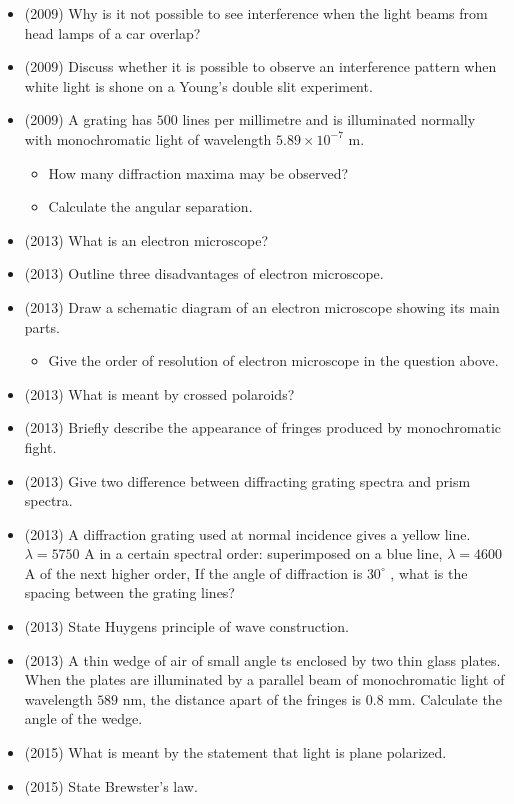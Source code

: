 \documentclass{article}
\begin{document}
\begin{itemize}
\item (2009)  Why is it not possible to see interference when the light beams from head lamps of a car overlap?
\item (2009)  Discuss whether it is possible to observe an interference pattern when white light is shone on a Young’s double slit experiment.
\item (2009)  A grating has $ 500$ lines per millimetre and is illuminated normally with monochromatic light of wavelength $ 5.89 \times 10^{-7}$ m.
 \begin{itemize}
\item How many diffraction maxima may be observed?
\item Calculate the angular separation.
\end{itemize}
\item (2013)  What is an electron microscope? 
\item (2013)  Outline three disadvantages of electron microscope.
\item (2013)  Draw a schematic diagram of an electron microscope showing its main parts.
 \begin{itemize}
\item Give the order of resolution of electron microscope in the question above.
\end{itemize}
\item (2013)  What is meant by crossed polaroids? 
\item (2013)  Briefly describe the appearance of fringes produced by monochromatic fight.
\item (2013)  Give two difference between diffracting grating spectra and prism spectra.
\item (2013)  A diffraction grating used at normal incidence gives a yellow line. $ \lambda =5750$ A in a certain spectral order: superimposed on a blue line, $ \lambda =4600$ A of the next higher order, If the angle of diffraction is $ 30^{\circ}$ , what is the spacing between the grating lines? 
\item (2013)  State Huygens principle of wave construction. 
\item (2013)  A thin wedge of air of small angle ts enclosed by two thin glass plates. When the plates are illuminated by a parallel beam of monochromatic light of wavelength $ 589$ nm, the distance apart of the fringes is $ 0.8$ mm. Calculate the angle of the wedge. 
\item (2015)  What is meant by the statement that light is plane polarized.
\item (2015)  State Brewster’s law.

\end{itemize}
\end{document}
